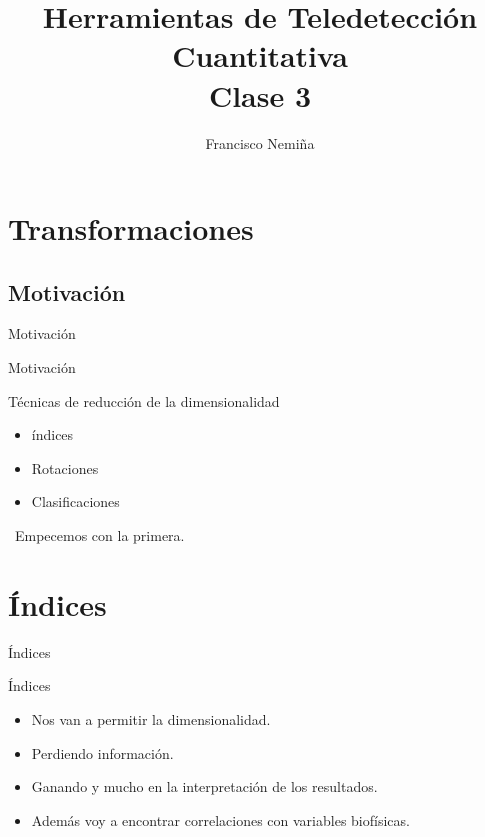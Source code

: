 \documentclass[handout]{beamer}
\title{Herramientas de Teledetección Cuantitativa\\{\small Clase 3}}
\author{Francisco Nemiña}
\institute{Unidad de Educación y Formación Masiva \\ Comisión Nacional de
Actividades Espaciales}
\date{}
\begin{document}
\begin{frame}
    \maketitle
\end{frame}

\section{Transformaciones}
\subsection{Motivación}

\begin{frame}{Motivación}
  \begin{center}
    \end{center}
\end{frame}

\begin{frame}{Motivación}
  \begin{block}{Técnicas de reducción de la dimensionalidad}
    \begin{itemize}[<+>]
      \item índices
      \item Rotaciones
      \item Clasificaciones
    \end{itemize}
    \pause\
    Empecemos con la primera.
  \end{block}
\end{frame}

\section{Índices}

\begin{frame}{Índices}
  \begin{block}{Índices}
    \begin{itemize}[<+>]
      \item Nos van a permitir la dimensionalidad.
      \item Perdiendo información.
      \item Ganando y mucho en la interpretación de los resultados.
      \item Además voy a encontrar correlaciones con variables biofísicas.
    \end{itemize}
  \end{block}
\end{frame}
\end{document}
